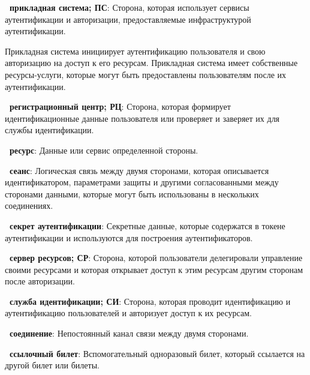 
{\bf \thedefctr~прикладная система; ПС}:
Сторона, которая использует сервисы аутентификации и авторизации,
предоставляемые инфраструктурой аутентификации.

\begin{note*}
Прикладная система инициирует аутентификацию пользователя 
и свою авторизацию на доступ к его ресурсам.
%
Прикладная система имеет собственные ресурсы-услуги, 
которые могут быть предоставлены пользователям после их аутентификации.
\end{note*}

{\bf \thedefctr~регистрационный центр; РЦ}:
Сторона, которая формирует идентификационные данные пользователя
или проверяет и заверяет их для службы идентификации. 


{\bf \thedefctr~ресурс}:
Данные или сервис определенной стороны. 


{\bf \thedefctr~сеанс}:
Логическая связь между двумя сторонами, которая описывается 
идентификатором, параметрами защиты и другими согласованными между 
сторонами данными, которые могут быть использованы в нескольких 
соединениях. 

{\bf \thedefctr~секрет аутентификации}:
Секретные данные, которые содержатся в токене аутентификации
и используются для построения аутентификаторов.

{\bf \thedefctr~сервер ресурсов; СР}:
Сторона, которой пользователи делегировали управление своими ресурсами и которая
открывает доступ к этим ресурсам другим сторонам после авторизации.

{\bf \thedefctr~служба идентификации; СИ}:
Сторона, которая проводит идентификацию и аутентификацию пользователей 
и авторизует доступ к их ресурсам.
	
{\bf \thedefctr~соединение}:
Непостоянный канал связи между двумя сторонами. 

{\bf \thedefctr~ссылочный билет}:
Вспомогательный одноразовый билет, который ссылается на другой билет или 
билеты.

